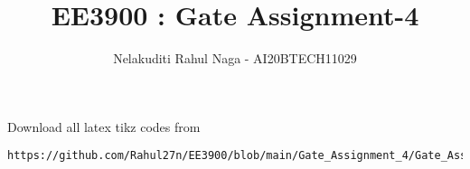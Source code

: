 \documentclass[journal,12pt,twocolumn]{IEEEtran}
\DeclareMathOperator*{\Res}{Res}
\begin{document}
\newcommand{\BEQA}{\begin{eqnarray}}
\newcommand{\EEQA}{\end{eqnarray}}
\newcommand{\define}{\stackrel{\triangle}{=}}

\raggedbottom
\setlength{\parindent}{0pt}
\providecommand{\mbf}{\mathbf}
\providecommand{\pr}[1]{\ensuremath{\Pr\left(#1\right)}}
\providecommand{\qfunc}[1]{\ensuremath{Q\left(#1\right)}}
\providecommand{\sbrak}[1]{\ensuremath{{}\left[#1\right]}}
\providecommand{\lsbrak}[1]{\ensuremath{{}\left[#1\right.}}
\providecommand{\rsbrak}[1]{\ensuremath{{}\left.#1\right]}}
\providecommand{\brak}[1]{\ensuremath{\left(#1\right)}}
\providecommand{\lbrak}[1]{\ensuremath{\left(#1\right.}}
\providecommand{\rbrak}[1]{\ensuremath{\left.#1\right)}}
\providecommand{\cbrak}[1]{\ensuremath{\left\{#1\right\}}}
\providecommand{\lcbrak}[1]{\ensuremath{\left\{#1\right.}}
\providecommand{\rcbrak}[1]{\ensuremath{\left.#1\right\}}}
\theoremstyle{remark}
\newtheorem{rem}{Remark}
\newcommand{\sgn}{\mathop{\mathrm{sgn}}}
\providecommand{\abs}[1]{\vert#1\vert}
\providecommand{\res}[1]{\Res\displaylimits_{#1}} 
\providecommand{\norm}[1]{\lVert#1\rVert}
\providecommand{\mtx}[1]{\mathbf{#1}}
\providecommand{\mean}[1]{E[ #1 ]}
\providecommand{\fourier}{\overset{\mathcal{F}}{ \rightleftharpoons}}
\providecommand{\system}{\overset{\mathcal{H}}{ \longleftrightarrow}}
\newcommand{\solution}{\noindent \textbf{Solution: }}
\newcommand{\cosec}{\,\text{cosec}\,}
\providecommand{\dec}[2]{\ensuremath{\overset{#1}{\underset{#2}{\gtrless}}}}
\newcommand{\myvec}[1]{\ensuremath{\begin{pmatrix}#1\end{pmatrix}}}
\newcommand{\mydet}[1]{\ensuremath{\begin{vmatrix}#1\end{vmatrix}}}
\makeatletter
{}
\makeatother
\let\StandardTheFigure\thefigure
\let\vec\mathbf
\renewcommand{\thefigure}{\theproblem}
\def\putbox#1#2#3{\makebox[0in][l]{\makebox[#1][l]{}\raisebox{\baselineskip}[0in][0in]{\raisebox{#2}[0in][0in]{#3}}}}
     \def\rightbox#1{\makebox[0in][r]{#1}}
     \def\centbox#1{\makebox[0in]{#1}}
     \def\topbox#1{\raisebox{-\baselineskip}[0in][0in]{#1}}
     \def\midbox#1{\raisebox{-0.5\baselineskip}[0in][0in]{#1}}
\vspace{3cm}
\title{ EE3900 : Gate Assignment-4}
\author{Nelakuditi Rahul Naga - AI20BTECH11029}
\maketitle
\newpage
\bigskip
\renewcommand{\thefigure}{\theenumi}
\renewcommand{\thetable}{\theenumi}
Download all latex tikz codes from 
\begin{lstlisting}
https://github.com/Rahul27n/EE3900/blob/main/Gate_Assignment_4/Gate_Assignment_4.tex
\end{lstlisting}
\vspace{0.5cm}
\end{document}
